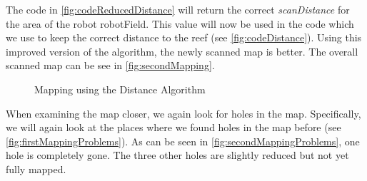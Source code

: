 \documentclass[twoside, 12pt]{article}
\begin{document}
\begin{figure}
\vspace{-50pt}
\end{figure}

The code in \autoref{fig:codeReducedDistance} will return the correct \textit{scanDistance} for the area of the robot robotField. This value will now be used in the code which we use to keep the correct distance to the reef (see \autoref{fig:codeDistance}). Using this improved version of the algorithm, the newly scanned map is better. The overall scanned map can be see in \autoref{fig:secondMapping}.\\

\begin{figure}
\vspace{0pt}
  \begin{center}
  \end{center}
\vspace{-20pt}
  \caption{Mapping using the Distance Algorithm}
  \label{fig:secondMapping}
\vspace{20pt}
\end{figure}

\begin{figure}
\vspace{-50pt}
\end{figure}

When examining the map closer, we again look for holes in the map. Specifically, we will again look at the places where we found holes in the map before (see \autoref{fig:firstMappingProblems}). As can be seen in \autoref{fig:secondMappingProblems}, one hole is completely gone. The three other holes are slightly reduced but not yet fully mapped.\\
\end{document}
